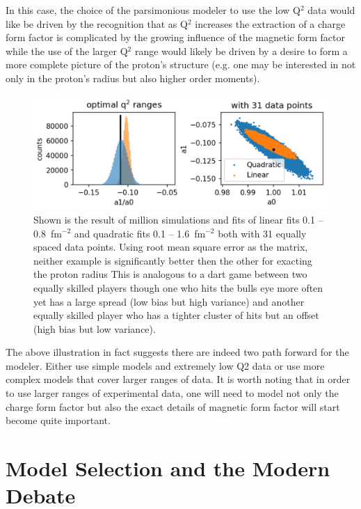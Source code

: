 \documentclass[10pt,aps,prc,twocolumn]{revtex4-1}
\begin{document}
In this case, the choice of the parsimonious modeler to use the low Q$^2$ data would like be driven by the recognition that as Q$^2$ increases
the extraction of a charge form factor is complicated by the growing influence of the magnetic form factor while the use of the larger Q$^2$
range would likely be driven by a desire to form a more complete picture of the proton's structure 
(e.g. one may be interested in not only in the proton's radius but also higher order moments).


\begin{figure}
\label{zoptimized}
\includegraphics[width=\columnwidth]{Figure/zoptimized.png}
\caption{Shown is the result of million simulations and fits of linear fits  0.1 -- 0.8~fm$^{-2}$ 
and quadratic fits 0.1 -- 1.6~fm$^{-2}$ both with 31 equally spaced data points.    Using root mean
square error as the matrix, neither example is significantly better then the other for exacting the proton
radius   This is analogous to a dart game between two equally skilled players though one who hits the bulls eye more 
often yet has a large spread (low bias but high variance) and another equally skilled player who has a tighter cluster of hits
but an offset (high bias but low variance).}
\end{figure}

The above illustration in fact suggests there are indeed two path forward for the modeler.   Either use simple models and extremely low Q2 
data or use more complex models that cover larger ranges of data.   It is worth noting that in order to use larger ranges
of experimental data, one will need to model not only the charge form factor but also the exact details of  magnetic form factor
will start become quite important.


\section{Model Selection and the Modern Debate}
\end{document}
